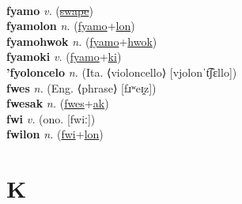  \label{'futpol} \\
\textbf{fyamo} \textit{v.} (\hyperref[swape]{\sout{swape}})
 \label{fyamo} \\
\textbf{fyamolon} \textit{n.} (\hyperref[fyamo]{fyamo}+\hyperref[lon]{lon})
 \label{fyamolon} \\
\textbf{fyamohwok} \textit{n.} (\hyperref[fyamo]{fyamo}+\hyperref[hwok]{hwok})
 \label{fyamohwok} \\
\textbf{fyamoki} \textit{v.} (\hyperref[fyamo]{fyamo}+\hyperref[ki]{ki})
 \label{fyamoki} \\
\textbf{'fyoloncelo} \textit{n.} (Ita. ⟨violoncello⟩ [vjolonˈt͡ʃɛllo])
 \label{'fyoloncelo} \\
\textbf{fwes} \textit{n.} (Eng. ⟨phrase⟩ [fɹʷeɪ̯z])
 \label{fwes} \\
\textbf{fwesak} \textit{n.} (\hyperref[fwes]{fwes}+\hyperref[ak]{ak})
 \label{fwesak} \\
\textbf{fwi} \textit{v.} (ono. [fwiː])
 \label{fwi} \\
\textbf{fwilon} \textit{n.} (\hyperref[fwi]{fwi}+\hyperref[lon]{lon})
 \label{fwilon} 

\section{K}

